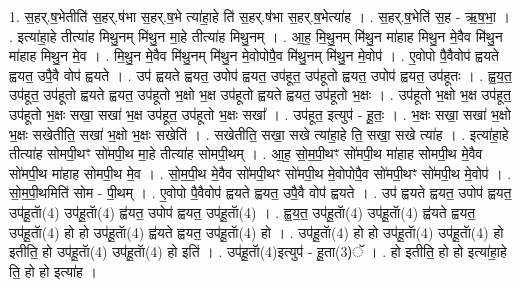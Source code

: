 \documentclass[17pt]{extarticle}
\begin{document}
1. स॒हर्.ष॒भेतीति॑ स॒हर्.ष॑भा स॒हर्.ष॒भे त्या॑हा॒हे ति॑ स॒हर्.ष॑भा स॒हर्.ष॒भेत्या॑ह । . स॒हर्.ष॒भेति॑ स॒ह - ऋ॒ष॒भा॒ । . इत्या॑हा॒हे तीत्या॑ह मिथु॒नम् मि॑थु॒न मा॒हे तीत्या॑ह मिथु॒नम् । . आ॒ह॒ मि॒थु॒नम् मि॑थु॒न मा॑हाह मिथु॒न मे॒वैव मि॑थु॒न मा॑हाह मिथु॒न मे॒व । . मि॒थु॒न मे॒वैव मि॑थु॒नम् मि॑थु॒न मे॒वोपोपै॒व मि॑थु॒नम् मि॑थु॒न मे॒वोप॑ । . ए॒वोपो पै॒वैवोप॑ ह्वयते ह्वयत॒ उपै॒वै वोप॑ ह्वयते । . उप॑ ह्वयते ह्वयत॒ उपोप॑ ह्वयत॒ उप॑हूत॒ उप॑हूतो ह्वयत॒ उपोप॑ ह्वयत॒ उप॑हूतः । . ह्व॒य॒त॒ उप॑हूत॒ उप॑हूतो ह्वयते ह्वयत॒ उप॑हूतो भ॒क्षो भ॒क्ष उप॑हूतो ह्वयते ह्वयत॒ उप॑हूतो भ॒क्षः । . उप॑हूतो भ॒क्षो भ॒क्ष उप॑हूत॒ उप॑हूतो भ॒क्षः सखा॒ सखा॑ भ॒क्ष उप॑हूत॒ उप॑हूतो भ॒क्षः सखा᳚ । . उप॑हूत॒ इत्युप॑ - हू॒तः॒ । . भ॒क्षः सखा॒ सखा॑ भ॒क्षो भ॒क्षः सखेतीति॒ सखा॑ भ॒क्षो भ॒क्षः सखेति॑ । . सखेतीति॒ सखा॒ सखे त्या॑हा॒हे ति॒ सखा॒ सखे त्या॑ह । . इत्या॑हा॒हे तीत्या॑ह सोमपी॒थꣳ सो॑मपी॒थ मा॒हे तीत्या॑ह सोमपी॒थम् । . आ॒ह॒ सो॒म॒पी॒थꣳ सो॑मपी॒थ मा॑हाह सोमपी॒थ मे॒वैव सो॑मपी॒थ मा॑हाह सोमपी॒थ मे॒व । . सो॒म॒पी॒थ मे॒वैव सो॑मपी॒थꣳ सो॑मपी॒थ मे॒वोपोपै॒व सो॑मपी॒थꣳ सो॑मपी॒थ मे॒वोप॑ । . सो॒म॒पी॒थमिति॑ सोम - पी॒थम् । . ए॒वोपो पै॒वैवोप॑ ह्वयते ह्वयत॒ उपै॒वै वोप॑ ह्वयते । . उप॑ ह्वयते ह्वयत॒ उपोप॑ ह्वयत॒ उप॑हू॒ताॅ(4) उप॑हू॒ताॅ(4) ह्व॑यत॒ उपोप॑ ह्वयत॒ उप॑हू॒ताॅ(4) । . ह्व॒य॒त॒ उप॑हू॒ताॅ(4) उप॑हू॒ताॅ(4) ह्व॑यते ह्वयत॒ उप॑हू॒ताॅ(4) हो हो उप॑हू॒ताॅ(4) ह्व॑यते ह्वयत॒ उप॑हू॒ताॅ(4) हो । . उप॑हू॒ताॅ(4) हो हो उप॑हू॒ताॅ(4) उप॑हू॒ताॅ(4) हो इतीति॒ हो उप॑हू॒ताॅ(4) उप॑हू॒ताॅ(4) हो इति॑ । . उप॑हू॒ताॅ(4)इत्युप॑ - हू॒ता(3)ॅ । . हो इतीति॒ हो हो इत्या॑हा॒हे ति॒ हो हो इत्या॑ह । \newline
\end{document}
